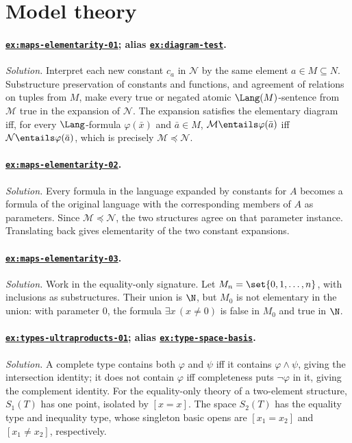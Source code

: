 \section{Model theory}

\paragraph{\hyperref[ex:maps-elementarity-01]{\texttt{ex:maps-elementarity-01}};
alias \hyperref[ex:diagram-test]{\texttt{ex:diagram-test}}.}
\textit{Solution.}  Interpret each new constant \(c_a\) in \(\mathcal N\) by
the same element \(a\in M\subseteq N\).  Substructure preservation of
constants and functions, and agreement of relations on tuples from \(M\), make
every true or negated atomic \(\Lang(M)\)-sentence from \(\mathcal M\) true in
the expansion of \(\mathcal N\).  The expansion satisfies the elementary
diagram iff, for every \(\Lang\)-formula \(\varphi(\bar x)\) and
\(\bar a\in M\),
\(\mathcal M\entails\varphi(\bar a)\) iff
\(\mathcal N\entails\varphi(\bar a)\), which is precisely
\(\mathcal M\preccurlyeq\mathcal N\).

\paragraph{\hyperref[ex:maps-elementarity-02]{\texttt{ex:maps-elementarity-02}}.}
\textit{Solution.}  Every formula in the language expanded by constants for
\(A\) becomes a formula of the original language with the corresponding
members of \(A\) as parameters.  Since \(\mathcal M\preccurlyeq\mathcal N\),
the two structures agree on that parameter instance.  Translating back gives
elementarity of the two constant expansions.

\paragraph{\hyperref[ex:maps-elementarity-03]{\texttt{ex:maps-elementarity-03}}.}\mbox{}\par
\noindent
\textit{Solution.}  Work in the equality-only signature.  Let
\(M_n=\set{0,1,\ldots,n}\), with inclusions as substructures.  Their union is
\(\N\), but \(M_0\) is not elementary in the union: with parameter \(0\), the
formula \(\exists x\,(x\ne0)\) is false in \(M_0\) and true in \(\N\).

\paragraph{\hyperref[ex:types-ultraproducts-01]{\texttt{ex:types-ultraproducts-01}};
alias \hyperref[ex:type-space-basis]{\texttt{ex:type-space-basis}}.}
\textit{Solution.}  A complete type contains both \(\varphi\) and \(\psi\)
iff it contains \(\varphi\land\psi\), giving the intersection
identity; it does not contain \(\varphi\) iff completeness puts \(\neg\varphi\)
in it, giving the complement identity.  For the equality-only theory of a
two-element structure, \(S_1(T)\) has one point, isolated by \([x=x]\).
The space \(S_2(T)\) has the equality type and inequality type, whose singleton
basic opens are \([x_1=x_2]\) and \([x_1\ne x_2]\), respectively.

